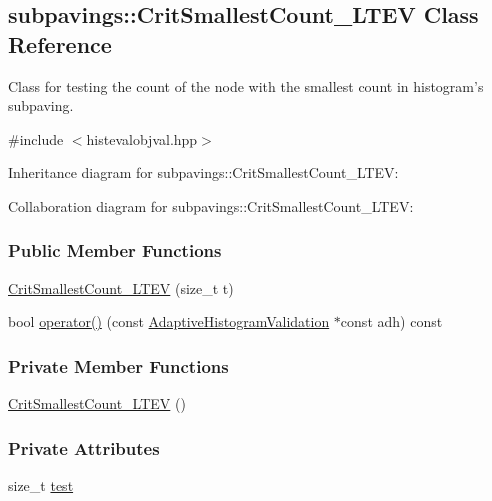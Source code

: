 \hypertarget{classsubpavings_1_1CritSmallestCount__LTEV}{\subsection{subpavings\-:\-:\-Crit\-Smallest\-Count\-\_\-\-L\-T\-E\-V \-Class \-Reference}
\label{classsubpavings_1_1CritSmallestCount__LTEV}
}


\-Class for testing the count of the node with the smallest count in histogram's subpaving.  




{\ttfamily \#include $<$histevalobjval.\-hpp$>$}



\-Inheritance diagram for subpavings\-:\-:\-Crit\-Smallest\-Count\-\_\-\-L\-T\-E\-V\-:


\-Collaboration diagram for subpavings\-:\-:\-Crit\-Smallest\-Count\-\_\-\-L\-T\-E\-V\-:
\subsubsection*{\-Public \-Member \-Functions}
\begin{DoxyCompactItemize}
\item 
\hyperlink{classsubpavings_1_1CritSmallestCount__LTEV_a0c2e26830ed18e8be3fe992a33fd3857}{\-Crit\-Smallest\-Count\-\_\-\-L\-T\-E\-V} (size\-\_\-t t)
\item 
bool \hyperlink{classsubpavings_1_1CritSmallestCount__LTEV_a7ed9d4d8c01c6de7f57113fbc6483401}{operator()} (const \hyperlink{classsubpavings_1_1AdaptiveHistogramValidation}{\-Adaptive\-Histogram\-Validation} $\ast$const adh) const 
\end{DoxyCompactItemize}
\subsubsection*{\-Private \-Member \-Functions}
\begin{DoxyCompactItemize}
\item 
\hyperlink{classsubpavings_1_1CritSmallestCount__LTEV_a0bf335ff5c4d2adb259b2300f9c8653c}{\-Crit\-Smallest\-Count\-\_\-\-L\-T\-E\-V} ()
\end{DoxyCompactItemize}
\subsubsection*{\-Private \-Attributes}
\begin{DoxyCompactItemize}
\item 
size\-\_\-t \hyperlink{classsubpavings_1_1CritSmallestCount__LTEV_aee3cca6ae148635a8377362170ca8d91}{test}
\end{DoxyCompactItemize}


